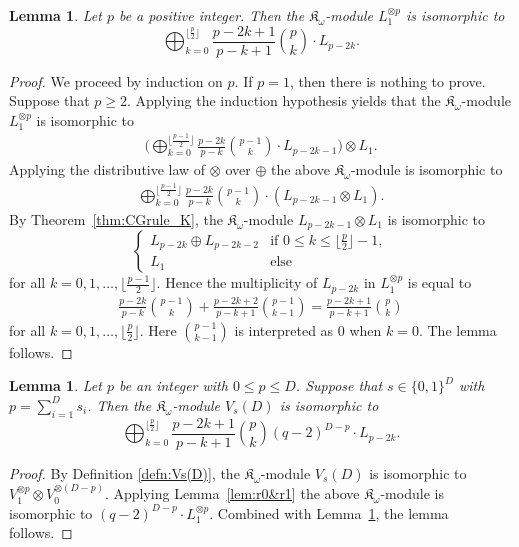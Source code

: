 \documentclass[pdftex]{sigma}%
\def\K{\mathfrak K_\omega}
\numberwithin{equation}{section}
\newtheorem{Lemma}[Theorem]{Lemma}
\begin{document}
\begin{Lemma}\label{lem:K1p}
Let $p$ be a positive integer. Then the $\K$-module $L_1^{\otimes p}$ is isomorphic to
\[
\bigoplus_{k=0}^{\lfloor\frac{p}{2}\rfloor}
\frac{p-2k+1}{p-k+1}{p\choose k}\cdot L_{p-2k}.
\]
\end{Lemma}
\begin{proof}
We proceed by induction on $p$. If $p=1$, then there is nothing to prove. Suppose that $p\geq 2$. Applying the induction hypothesis yields that the $\K$-module $L_1^{\otimes p}$ is isomorphic to
\begin{align*}
\bigg(\bigoplus_{k=0}^{\lfloor \frac{p-1}{2}\rfloor}
\frac{p-2k}{p-k}{p-1\choose k}\cdot L_{p-2k-1}\bigg)\otimes L_1.
\end{align*}
Applying the distributive law of $\otimes$ over $\oplus$ the above $\K$-module is isomorphic to
\begin{align*}
\bigoplus_{k=0}^{\lfloor \frac{p-1}{2}\rfloor}
\frac{p-2k}{p-k}{p-1\choose k} \cdot(L_{p-2k-1}\otimes L_1).
\end{align*}
By Theorem~\ref{thm:CGrule_K}, the $\K$-module $L_{p-2k-1}\otimes L_1$ is isomorphic to
\[
\begin{cases}
L_{p-2k}\oplus L_{p-2k-2}
&\text{if $0\leq k\leq \big\lfloor \frac{p}{2} \big\rfloor-1$},
\\
L_1&\text{else}
\end{cases}
\]
for all $k=0,1,\dots,\big\lfloor \frac{p-1}{2}\big\rfloor$. Hence the multiplicity of $L_{p-2k}$ in $L_1^{\otimes p}$ is equal to
\begin{gather*}
\frac{p-2k}{p-k}{p-1\choose k}+\frac{p-2k+2}{p-k+1}{p-1\choose k-1}=\frac{p-2k+1}{p-k+1}{p\choose k}
\end{gather*}
for all $k=0,1,\dots,\big\lfloor\frac{p}{2}\big\rfloor$. Here ${p-1 \choose k-1}$ is interpreted as $0$ when $k=0$.
The lemma follows.
\end{proof}



\begin{Lemma}\label{lem:dec_Vs(D)}
Let $p$ be an integer with $0\leq p\leq D$.
Suppose that $s\in \{0,1\}^D$ with $p=\sum_{i=1}^D s_i$. Then the $\K$-module $V_s(D)$ is isomorphic to
\[
\bigoplus_{k=0}^{\lfloor \frac{p}{2} \rfloor}
\frac{p-2k+1}{p-k+1}{p\choose k}
(q-2)^{D-p}\cdot L_{p-2k}.
\]
\end{Lemma}

\begin{proof}
By Definition \ref{defn:Vs(D)}, the $\K$-module $V_s(D)$ is isomorphic to
$V_1^{\otimes p}\otimes V_0^{\otimes (D-p)}$.
Applying Lemma~\ref{lem:r0&r1} the above $\K$-module is isomorphic to
$(q-2)^{D-p}\cdot L_1^{\otimes p}$.
Combined with Lemma~\ref{lem:K1p}, the lemma follows.
\end{proof}
\end{document}
